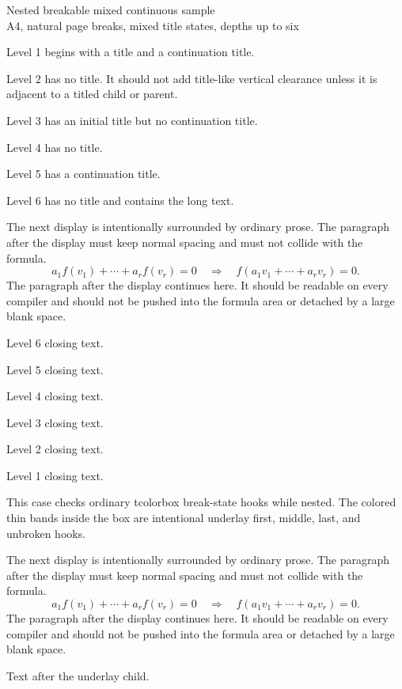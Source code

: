 \documentclass[a4paper,10pt]{article}
\newcommand{\mathblock}{%
The next display is intentionally surrounded by ordinary prose. The paragraph
after the display must keep normal spacing and must not collide with the
formula.
\[
  a_1f(v_1)+\cdots+a_rf(v_r)=0
  \quad\Longrightarrow\quad
  f(a_1v_1+\cdots+a_rv_r)=0.
\]
The paragraph after the display continues here. It should be readable on every
compiler and should not be pushed into the formula area or detached by a large
blank space.
}
\newcommand{\plainrun}{%
\lipsum[1-3]
\mathblock
\lipsum[4-7]
}
\begin{document}
\begin{center}
{\Large Nested breakable mixed continuous sample}\\[2mm]
{\small A4, natural page breaks, mixed title states, depths up to six}
\end{center}

\lipsum[1-4]

\begin{levelone}[title={L1 titled},title after break={L1 continued}]
Level 1 begins with a title and a continuation title.

\begin{leveltwo}
Level 2 has no title. It should not add title-like vertical clearance unless it
is adjacent to a titled child or parent.

\begin{levelthree}[title={L3 titled},notitle after break]
Level 3 has an initial title but no continuation title.

\begin{levelfour}
Level 4 has no title.

\begin{levelfive}[title={L5 titled},title after break={L5 continued}]
Level 5 has a continuation title.

\begin{levelsix}
Level 6 has no title and contains the long text.

\plainrun

Level 6 closing text.
\end{levelsix}

Level 5 closing text.
\end{levelfive}

Level 4 closing text.
\end{levelfour}

Level 3 closing text.
\end{levelthree}

Level 2 closing text.
\end{leveltwo}

Level 1 closing text.
\end{levelone}

\lipsum[8-10]

\begin{levelone}[title={Underlay break-state outer},notitle after break]
This case checks ordinary tcolorbox break-state hooks while nested. The colored
thin bands inside the box are intentional underlay first, middle, last, and
unbroken hooks.

\begin{leveltwo}[suite underlay,title={Underlay child},title after break={Underlay child continued}]
\lipsum[11-12]
\mathblock
\lipsum[13-17]
\end{leveltwo}

Text after the underlay child.
\end{levelone}
\end{document}

